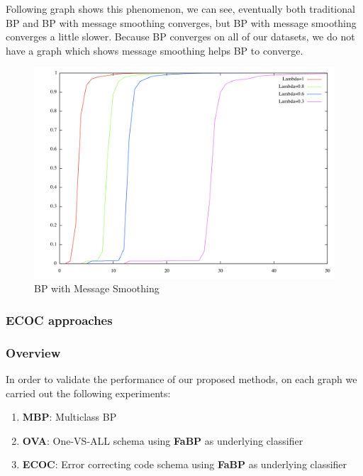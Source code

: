 Following graph shows this phenomenon, we can see, eventually both traditional BP and BP with message smoothing converges, but BP with message smoothing converges a little slower. Because BP converges on all of our datasets, we do not have a graph which shows message smoothing helps BP to converge.

\begin{figure}[!ht]
\centering
\begin{minipage}[b]{0.5\linewidth}
\centering
\includegraphics[width=\textwidth]{FIG/smooth.png}
\caption{BP with Message Smoothing}
\end{minipage}
\end{figure}

\subsubsection{ECOC approaches}
\subsubsection*{Overview}
In order to validate the performance of our proposed methods, on each graph we carried out the following experiments:
\begin{enumerate}
	\item \textbf{MBP}: Multiclass BP
	\item \textbf{OVA}: One-VS-ALL schema using \textbf{FaBP} as underlying classifier
	\item \textbf{ECOC}: Error correcting code schema using \textbf{FaBP} as underlying classifier
\end{enumerate}

